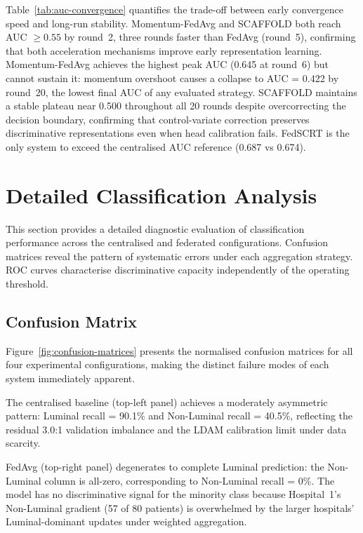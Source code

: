 Table~\ref{tab:auc-convergence} quantifies the trade-off
between early convergence speed and long-run stability.
Momentum-FedAvg and SCAFFOLD both reach AUC $\geq 0.55$
by round~2, three rounds faster than FedAvg (round~5),
confirming that both acceleration mechanisms improve
early representation learning.
Momentum-FedAvg achieves the highest peak AUC (0.645 at
round~6) but cannot sustain it: momentum overshoot
causes a collapse to AUC = 0.422 by round~20, the lowest
final AUC of any evaluated strategy.
SCAFFOLD maintains a stable plateau near 0.500 throughout
all 20 rounds despite overcorrecting the decision boundary,
confirming that control-variate correction preserves
discriminative representations even when head calibration
fails.
FedSCRT is the only system to exceed the centralised AUC
reference (0.687 vs 0.674).


\section{Detailed Classification Analysis}
\label{sec:classification-performance}

This section provides a detailed diagnostic evaluation
of classification performance across the centralised and
federated configurations.
Confusion matrices reveal the pattern of systematic errors
under each aggregation strategy.
ROC curves characterise discriminative capacity
independently of the operating threshold.

\subsection{Confusion Matrix}
\label{sec:confusion-matrix}

Figure~\ref{fig:confusion-matrices} presents the
normalised confusion matrices for all four experimental
configurations, making the distinct failure modes of
each system immediately apparent.

The centralised baseline (top-left panel) achieves a
moderately asymmetric pattern: Luminal recall = 90.1\%
and Non-Luminal recall = 40.5\%, reflecting the
residual 3.0:1 validation imbalance and the LDAM
calibration limit under data scarcity.

FedAvg (top-right panel) degenerates to complete
Luminal prediction: the Non-Luminal column is all-zero,
corresponding to Non-Luminal recall = 0\%.
The model has no discriminative signal for the minority
class because Hospital~1's Non-Luminal gradient (57 of
80 patients) is overwhelmed by the larger hospitals'
Luminal-dominant updates under weighted aggregation.

